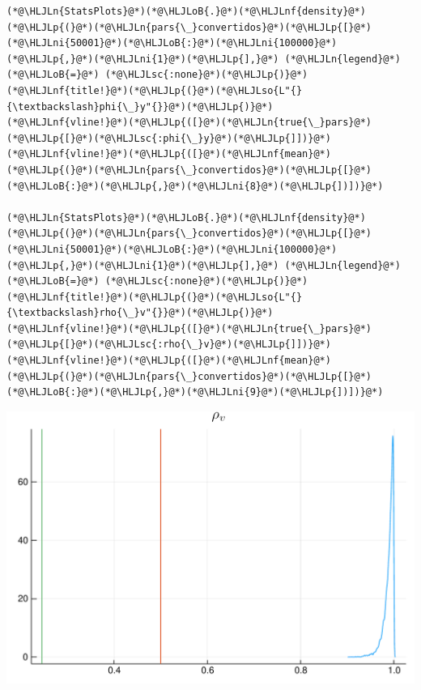 \documentclass[12pt,a4paper]{article}
\newcommand{\HLJLn}[1]{#1}
\newcommand{\HLJLnf}[1]{\textcolor[RGB]{66,102,213}{#1}}
\newcommand{\HLJLsc}[1]{\textcolor[RGB]{201,61,57}{#1}}
\newcommand{\HLJLso}[1]{\textcolor[RGB]{201,61,57}{#1}}
\newcommand{\HLJLni}[1]{\textcolor[RGB]{59,151,46}{#1}}
\newcommand{\HLJLoB}[1]{\textcolor[RGB]{102,102,102}{\textbf{#1}}}
\newcommand{\HLJLp}[1]{#1}
\begin{document}
\begin{lstlisting}
(*@\HLJLn{StatsPlots}@*)(*@\HLJLoB{.}@*)(*@\HLJLnf{density}@*)(*@\HLJLp{(}@*)(*@\HLJLn{pars{\_}convertidos}@*)(*@\HLJLp{[}@*)(*@\HLJLni{50001}@*)(*@\HLJLoB{:}@*)(*@\HLJLni{100000}@*)(*@\HLJLp{,}@*)(*@\HLJLni{1}@*)(*@\HLJLp{],}@*) (*@\HLJLn{legend}@*) (*@\HLJLoB{=}@*) (*@\HLJLsc{:none}@*)(*@\HLJLp{)}@*)
(*@\HLJLnf{title!}@*)(*@\HLJLp{(}@*)(*@\HLJLso{L"{}{\textbackslash}phi{\_}y"{}}@*)(*@\HLJLp{)}@*)
(*@\HLJLnf{vline!}@*)(*@\HLJLp{([}@*)(*@\HLJLn{true{\_}pars}@*)(*@\HLJLp{[}@*)(*@\HLJLsc{:phi{\_}y}@*)(*@\HLJLp{]])}@*)
(*@\HLJLnf{vline!}@*)(*@\HLJLp{([}@*)(*@\HLJLnf{mean}@*)(*@\HLJLp{(}@*)(*@\HLJLn{pars{\_}convertidos}@*)(*@\HLJLp{[}@*)(*@\HLJLoB{:}@*)(*@\HLJLp{,}@*)(*@\HLJLni{8}@*)(*@\HLJLp{])])}@*)

(*@\HLJLn{StatsPlots}@*)(*@\HLJLoB{.}@*)(*@\HLJLnf{density}@*)(*@\HLJLp{(}@*)(*@\HLJLn{pars{\_}convertidos}@*)(*@\HLJLp{[}@*)(*@\HLJLni{50001}@*)(*@\HLJLoB{:}@*)(*@\HLJLni{100000}@*)(*@\HLJLp{,}@*)(*@\HLJLni{1}@*)(*@\HLJLp{],}@*) (*@\HLJLn{legend}@*) (*@\HLJLoB{=}@*) (*@\HLJLsc{:none}@*)(*@\HLJLp{)}@*)
(*@\HLJLnf{title!}@*)(*@\HLJLp{(}@*)(*@\HLJLso{L"{}{\textbackslash}rho{\_}v"{}}@*)(*@\HLJLp{)}@*)
(*@\HLJLnf{vline!}@*)(*@\HLJLp{([}@*)(*@\HLJLn{true{\_}pars}@*)(*@\HLJLp{[}@*)(*@\HLJLsc{:rho{\_}v}@*)(*@\HLJLp{]])}@*)
(*@\HLJLnf{vline!}@*)(*@\HLJLp{([}@*)(*@\HLJLnf{mean}@*)(*@\HLJLp{(}@*)(*@\HLJLn{pars{\_}convertidos}@*)(*@\HLJLp{[}@*)(*@\HLJLoB{:}@*)(*@\HLJLp{,}@*)(*@\HLJLni{9}@*)(*@\HLJLp{])])}@*)
\end{lstlisting}

\includegraphics[width=\linewidth]{figures/dsge_and_julia_21_1.pdf}
\end{document}
